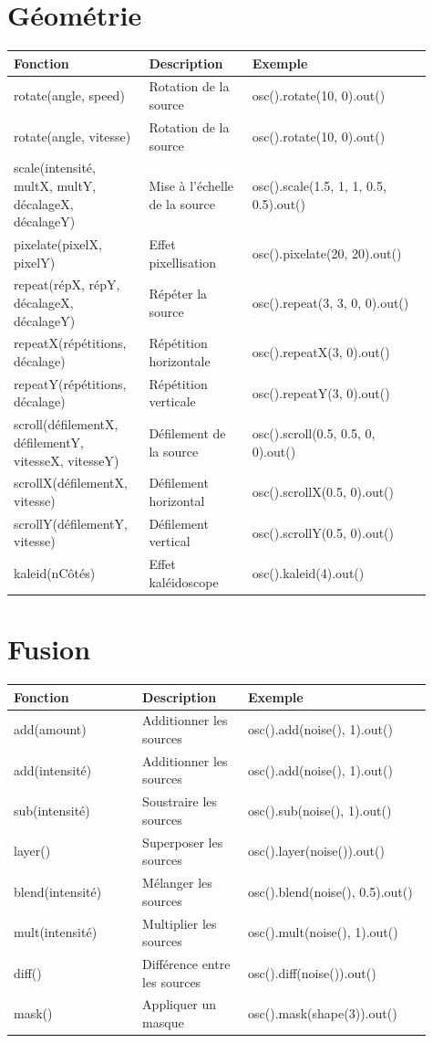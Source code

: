 \documentclass[9pt,oneside]{amsart}
\begin{document}
\section*{Géométrie}
\begin{tabular}{L{0.28\linewidth}L{0.23\linewidth}L{0.40\linewidth}}
\toprule
\textbf{Fonction} & \textbf{Description} & \textbf{Exemple} \\
\midrule
rotate(angle, speed) & Rotation de la source & osc().rotate(10, 0).out() \\
rotate(angle, vitesse) & Rotation de la source & osc().rotate(10, 0).out() \\
scale(intensité, multX, multY, décalageX, décalageY) & Mise à l'échelle de la source & osc().scale(1.5, 1, 1, 0.5, 0.5).out() \\
pixelate(pixelX, pixelY) & Effet pixellisation & osc().pixelate(20, 20).out() \\
repeat(répX, répY, décalageX, décalageY) & Répéter la source & osc().repeat(3, 3, 0, 0).out() \\
repeatX(répétitions, décalage) & Répétition horizontale & osc().repeatX(3, 0).out() \\
repeatY(répétitions, décalage) & Répétition verticale & osc().repeatY(3, 0).out() \\
scroll(défilementX, défilementY, vitesseX, vitesseY) & Défilement de la source & osc().scroll(0.5, 0.5, 0, 0).out() \\
scrollX(défilementX, vitesse) & Défilement horizontal & osc().scrollX(0.5, 0).out() \\
scrollY(défilementY, vitesse) & Défilement vertical & osc().scrollY(0.5, 0).out() \\
kaleid(nCôtés) & Effet kaléidoscope & osc().kaleid(4).out() \\
\bottomrule
\end{tabular}

\section*{Fusion}
\begin{tabular}{L{0.28\linewidth}L{0.23\linewidth}L{0.40\linewidth}}
\toprule
\textbf{Fonction} & \textbf{Description} & \textbf{Exemple} \\
\midrule
add(amount) & Additionner les sources & osc().add(noise(), 1).out() \\
add(intensité) & Additionner les sources & osc().add(noise(), 1).out() \\
sub(intensité) & Soustraire les sources & osc().sub(noise(), 1).out() \\
layer() & Superposer les sources & osc().layer(noise()).out() \\
blend(intensité) & Mélanger les sources & osc().blend(noise(), 0.5).out() \\
mult(intensité) & Multiplier les sources & osc().mult(noise(), 1).out() \\
diff() & Différence entre les sources & osc().diff(noise()).out() \\
mask() & Appliquer un masque & osc().mask(shape(3)).out() \\
\bottomrule
\end{tabular}
\end{document}
